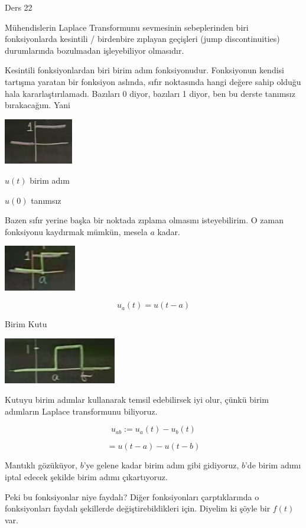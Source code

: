 \documentclass[12pt,fleqn]{article}\usepackage{../../common}
\begin{document}
Ders 22

Mühendislerin Laplace Transformunu sevmesinin sebeplerinden biri
fonksiyonlarda kesintili / birdenbire zıplayan geçişleri (jump
discontinuities) durumlarında bozulmadan işleyebiliyor olmasıdır. 

Kesintili fonksiyonlardan biri birim adım fonksiyonudur. Fonksiyonun
kendisi tartışma yaratan bir fonksiyon aslında, sıfır noktasında hangi
değere sahip olduğu hala kararlaştırılamadı. Bazıları 0 diyor, bazıları 1
diyor, ben bu derste tanımsız bırakacağım. Yani

\includegraphics[height=2cm]{22_1.png}

$u(t)$ birim adım

$u(0)$ tanımsız

Bazen sıfır yerine başka bir noktada zıplama olmasını isteyebilirim. O
zaman fonksiyonu kaydırmak mümkün, mesela $a$ kadar. 

\includegraphics[height=2cm]{22_2.png}

$$ u_a(t) = u(t-a) $$

Birim Kutu

\includegraphics[height=2cm]{22_3.png}

Kutuyu birim adımlar kullanarak temsil edebilirsek iyi olur, çünkü
birim adımların Laplace transformunu biliyoruz. 

$$ u_{ab} := u_a(t) - u_b(t) $$

$$ = u(t-a) - u(t-b) $$

Mantıklı gözüküyor, $b$'ye gelene kadar birim adım gibi gidiyoruz, $b$'de
birim adımı iptal edecek şekilde birim adımı çıkartıyoruz. 

Peki bu fonksiyonlar niye faydalı? Diğer fonksiyonları çarptıklarında o
fonksiyonları faydalı şekillerde değiştirebildikleri için. Diyelim ki şöyle
bir $f(t)$ var.
\end{document}
